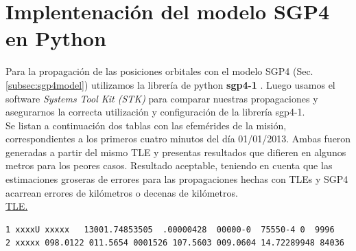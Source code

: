 \section{Implentenaci\'on del modelo SGP4 en Python}

Para la propagaci\'on de las posiciones orbitales con el modelo SGP4 (Sec. \ref{subsec:sgp4model}) utilizamos la librer\'ia de python {\bf{sgp4-1}} \citep{sgp4python}.
Luego usamos el software {\it{Systems Tool Kit (STK)}} \citep{stk} para comparar nuestras propagaciones y asegurarnos la correcta utilizaci\'on y configuraci\'on de la librer\'ia sgp4-1.\\

Se listan a continuaci\'on dos tablas con las efem\'erides de la misi\'on, correspondientes a los primeros cuatro minutos del d\'ia 01/01/2013.
Ambas fueron generadas a partir del mismo TLE y presentas resultados que difieren en algunos metros para los peores casos. Resultado aceptable, teniendo en cuenta que las estimaciones groseras de errores para las propagaciones hechas con TLEs y SGP4 acarrean errores de kil\'ometros o decenas de kil\'ometros.\\

\underline{TLE.}
{\small
\begin{verbatim}
1 xxxxU xxxxx   13001.74853505  .00000428  00000-0  75550-4 0  9996
2 xxxxx 098.0122 011.5654 0001526 107.5603 009.0604 14.72289948 84036
\end{verbatim}}


\begin{table}[!h]
\centering
{}
\caption{Resultados que genera ARxCODE utilizando la librer\'ia sgp4 de python para la propagaci\'on.}
\end{table}

